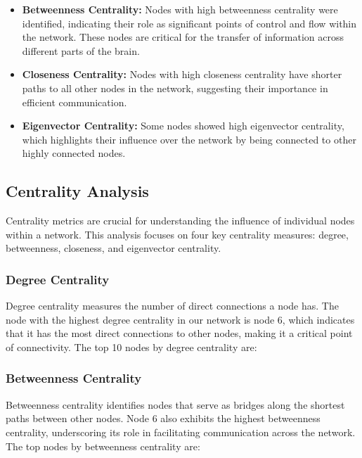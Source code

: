 \documentclass[
	report, %
	11pt, %
]{CSUniSchoolLabReport}
\begin{document}
\begin{itemize}
    \item \textbf{Betweenness Centrality:} Nodes with high betweenness centrality were identified, indicating their role as significant points of control and flow within the network. These nodes are critical for the transfer of information across different parts of the brain.
    \item \textbf{Closeness Centrality:} Nodes with high closeness centrality have shorter paths to all other nodes in the network, suggesting their importance in efficient communication.
    \item \textbf{Eigenvector Centrality:} Some nodes showed high eigenvector centrality, which highlights their influence over the network by being connected to other highly connected nodes.
\end{itemize}
\subsection{Centrality Analysis}

Centrality metrics are crucial for understanding the influence of individual nodes within a network. This analysis focuses on four key centrality measures: degree, betweenness, closeness, and eigenvector centrality.

\subsubsection{Degree Centrality}

Degree centrality measures the number of direct connections a node has. The node with the highest degree centrality in our network is node 6, which indicates that it has the most direct connections to other nodes, making it a critical point of connectivity. The top 10 nodes by degree centrality are:


\subsubsection{Betweenness Centrality}

Betweenness centrality identifies nodes that serve as bridges along the shortest paths between other nodes. Node 6 also exhibits the highest betweenness centrality, underscoring its role in facilitating communication across the network. The top nodes by betweenness centrality are:
\end{document}
